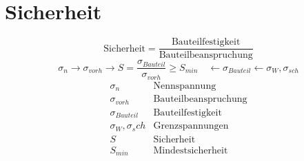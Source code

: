 



\section{Sicherheit}
\[ \text{Sicherheit} = \frac{\text{Bauteilfestigkeit}}{\text{Bauteilbeanspruchung}} \]
\[ \sigma_n  \rightarrow \sigma_{vorh} \rightarrow 
S = \frac{\sigma_{Bauteil}}{\sigma_{vorh}} \geq S_{min}
\quad \leftarrow \sigma_{Bauteil} \leftarrow \sigma_W, \sigma_{sch} \]
\[ \begin{array}{ll}
\sigma_n & \text{Nennspannung}\\
\sigma_{vorh} & \text{Bauteilbeanspruchung}\\
\sigma_{Bauteil} & \text{Bauteilfestigkeit}\\
\sigma_W, \sigma_sch & \text{Grenzspannungen}\\
S & \text{Sicherheit}\\
S_{min} & \text{Mindestsicherheit}
\end{array} \]
